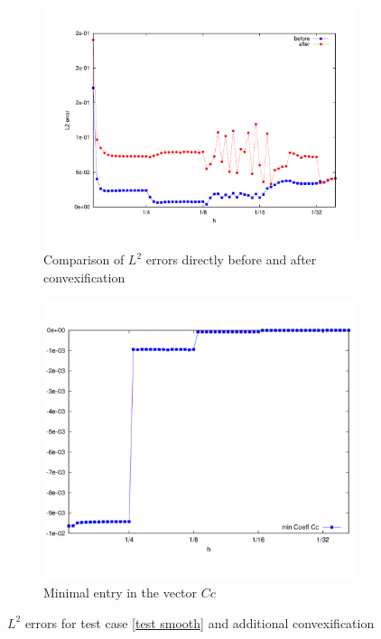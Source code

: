 \begin{figure}[H]
\centering
	\begin{subfigure}{0.45\textwidth}
		\centering
		\includegraphics[scale=0.25]{plots/MA1_convexComp.pdf}
		\caption{Comparison of $L^2$ errors directly before and after convexification}
		\label{fig: convex before after}
	\end{subfigure}
	\begin{subfigure}{0.45\textwidth}
		\centering
		\includegraphics[scale=0.25]{plots/MA1_minCoeff.pdf}
		\caption{Minimal entry in the vector $C c$}
		\label{fig: convex min coeffs}
	\end{subfigure}	
	\caption{$L^2$ errors for test case \ref{test smooth} and additional convexification}
	\label{fig: Compare test smooth ourMethodConvex}
\end{figure}


